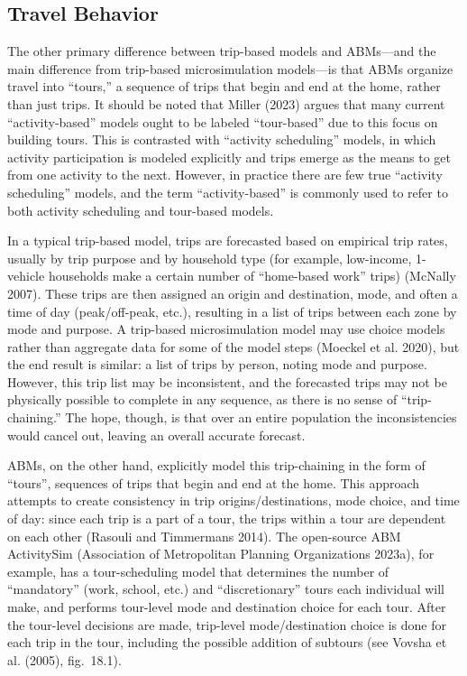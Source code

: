\documentclass[fancy, twoside, mastersfancy, ms]{byuthesis}
\begin{document}
\subsection{Travel Behavior}\label{travel-behavior}

The other primary difference between trip-based models and ABMs---and
the main difference from trip-based microsimulation models---is that
ABMs organize travel into ``tours,'' a sequence of trips that begin and
end at the home, rather than just trips. It should be noted that Miller
(2023) argues that many current ``activity-based'' models ought to be
labeled ``tour-based'' due to this focus on building tours. This is
contrasted with ``activity scheduling'' models, in which activity
participation is modeled explicitly and trips emerge as the means to get
from one activity to the next. However, in practice there are few true
``activity scheduling'' models, and the term ``activity-based'' is
commonly used to refer to both activity scheduling and tour-based
models.

In a typical trip-based model, trips are forecasted based on empirical
trip rates, usually by trip purpose and by household type (for example,
low-income, 1-vehicle households make a certain number of ``home-based
work'' trips) (McNally 2007). These trips are then assigned an origin
and destination, mode, and often a time of day (peak/off-peak, etc.),
resulting in a list of trips between each zone by mode and purpose. A
trip-based microsimulation model may use choice models rather than
aggregate data for some of the model steps (Moeckel et al. 2020), but
the end result is similar: a list of trips by person, noting mode and
purpose. However, this trip list may be inconsistent, and the forecasted
trips may not be physically possible to complete in any sequence, as
there is no sense of ``trip-chaining.'' The hope, though, is that over
an entire population the inconsistencies would cancel out, leaving an
overall accurate forecast.

ABMs, on the other hand, explicitly model this trip-chaining in the form
of ``tours'', sequences of trips that begin and end at the home. This
approach attempts to create consistency in trip origins/destinations,
mode choice, and time of day: since each trip is a part of a tour, the
trips within a tour are dependent on each other (Rasouli and Timmermans
2014). The open-source ABM ActivitySim (Association of Metropolitan
Planning Organizations 2023a), for example, has a tour-scheduling model
that determines the number of ``mandatory'' (work, school, etc.) and
``discretionary'' tours each individual will make, and performs
tour-level mode and destination choice for each tour. After the
tour-level decisions are made, trip-level mode/destination choice is
done for each trip in the tour, including the possible addition of
subtours (see Vovsha et al. (2005), fig.~18.1).
\end{document}
